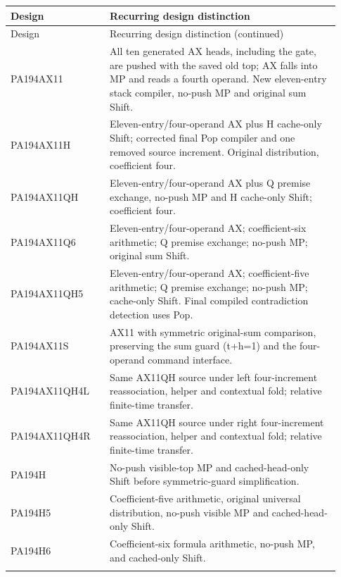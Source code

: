 \begingroup\small
\begin{longtable}{>{\raggedright\arraybackslash}p{0.28\linewidth}>{\raggedright\arraybackslash}p{0.65\linewidth}}
\toprule Design & Recurring design distinction\\\midrule\endfirsthead
\toprule Design & Recurring design distinction (continued)\\\midrule\endhead
\bottomrule\endfoot
PA194AX11 & All ten generated AX heads, including the gate, are pushed with the saved old top; AX falls into MP and reads a fourth operand. New eleven-entry stack compiler, no-push MP and original sum Shift.\\\addlinespace[4pt]
PA194AX11H & Eleven-entry/\allowbreak{}four-operand AX plus H cache-only Shift; corrected final Pop compiler and one removed source increment. Original distribution, coefficient four.\\\addlinespace[4pt]
PA194AX11QH & Eleven-entry/\allowbreak{}four-operand AX plus Q premise exchange, no-push MP and H cache-only Shift; coefficient four.\\\addlinespace[4pt]
PA194AX11Q6 & Eleven-entry/\allowbreak{}four-operand AX; coefficient-six arithmetic; Q premise exchange; no-push MP; original sum Shift.\\\addlinespace[4pt]
PA194AX11QH5 & Eleven-entry/\allowbreak{}four-operand AX; coefficient-five arithmetic; Q premise exchange; no-push MP; cache-only Shift. Final compiled contradiction detection uses Pop.\\\addlinespace[4pt]
PA194AX11S & AX11 with symmetric original-sum comparison, preserving the sum guard (t+h=1) and the four-operand command interface.\\\addlinespace[4pt]
PA194AX11QH4L & Same AX11QH source under left four-increment reassociation, helper and contextual fold; relative finite-time transfer.\\\addlinespace[4pt]
PA194AX11QH4R & Same AX11QH source under right four-increment reassociation, helper and contextual fold; relative finite-time transfer.\\\addlinespace[4pt]
PA194H & No-push visible-top MP and cached-head-only Shift before symmetric-guard simplification.\\\addlinespace[4pt]
PA194H5 & Coefficient-five arithmetic, original universal distribution, no-push visible MP and cached-head-only Shift.\\\addlinespace[4pt]
PA194H6 & Coefficient-six formula arithmetic, no-push MP, and cached-only Shift.\\\addlinespace[4pt]

\end{longtable}
